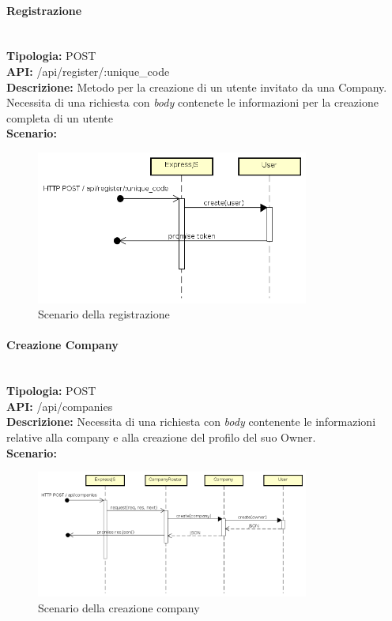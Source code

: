 \newpage
\paragraph{Registrazione}\mbox{}\\
\textbf{Tipologia:} POST \\
\textbf{API:} /api/register/:unique\_code \\
\textbf{Descrizione:} Metodo per la creazione di un utente invitato da una Company. Necessita di una richiesta con \textit{body} contenete le informazioni per la creazione completa di un utente \\
\textbf{Scenario:} 
\begin{figure}[H]
\centering
\includegraphics[width=0.8\textwidth]{res/sections/backend/sequence/(POST)register.png}
\caption{Scenario della registrazione}
\end{figure}

\newpage
\paragraph{Creazione Company}\mbox{}\\
\textbf{Tipologia:} POST \\
\textbf{API:} /api/companies \\
\textbf{Descrizione:} Necessita di una richiesta con \textit{body} contenente le informazioni relative alla company e alla creazione del profilo del suo Owner. \\
\textbf{Scenario:} 
\begin{figure}[H]
\centering
\includegraphics[width=0.8\textwidth]{res/sections/backend/sequence/(POST)company.png}
\caption{Scenario della creazione company}
\end{figure}

